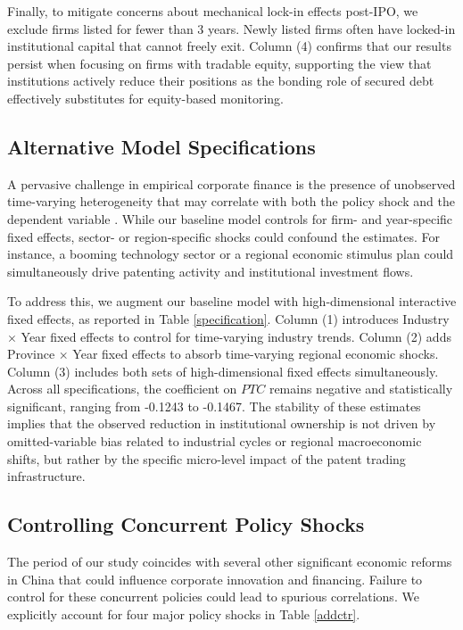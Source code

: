 \documentclass[12pt,a4paper]{article}
\begin{document}
Finally, to mitigate concerns about mechanical lock-in effects post-IPO, we exclude firms listed for fewer than 3 years. Newly listed firms often have locked-in institutional capital that cannot freely exit. Column (4) confirms that our results persist when focusing on firms with tradable equity, supporting the view that institutions actively reduce their positions as the bonding role of secured debt effectively substitutes for equity-based monitoring.

\subsection{Alternative Model Specifications}
A pervasive challenge in empirical corporate finance is the presence of unobserved time-varying heterogeneity that may correlate with both the policy shock and the dependent variable \citep{gormley2014common}. While our baseline model controls for firm- and year-specific fixed effects, sector- or region-specific shocks could confound the estimates. For instance, a booming technology sector or a regional economic stimulus plan could simultaneously drive patenting activity and institutional investment flows.

To address this, we augment our baseline model with high-dimensional interactive fixed effects, as reported in Table \ref{specification}. Column (1) introduces Industry $\times$ Year fixed effects to control for time-varying industry trends. Column (2) adds Province $\times$ Year fixed effects to absorb time-varying regional economic shocks. Column (3) includes both sets of high-dimensional fixed effects simultaneously. Across all specifications, the coefficient on $PTC$ remains negative and statistically significant, ranging from -0.1243 to -0.1467. The stability of these estimates implies that the observed reduction in institutional ownership is not driven by omitted-variable bias related to industrial cycles or regional macroeconomic shifts, but rather by the specific micro-level impact of the patent trading infrastructure.

\subsection{Controlling Concurrent Policy Shocks}
The period of our study coincides with several other significant economic reforms in China that could influence corporate innovation and financing. Failure to control for these concurrent policies could lead to spurious correlations. We explicitly account for four major policy shocks in Table \ref{addctr}.
\end{document}
